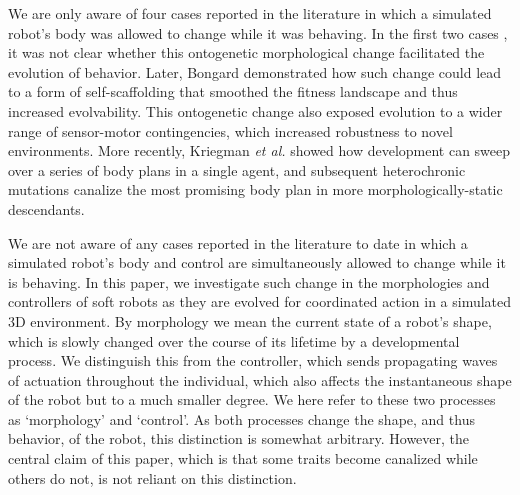 We are only aware of four cases reported in the literature in which a simulated robot's body was allowed to change while it was behaving.
In the first two cases \cite{ventrella1998designing, komosinski2003framsticks}, it was not clear whether this ontogenetic morphological change facilitated the evolution of behavior.
Later, Bongard \cite{bongard2011morphological} demonstrated how such change could lead to a form of self-scaffolding that smoothed the fitness landscape and thus increased evolvability.
This ontogenetic change also exposed evolution to a wider range of sensor-motor contingencies, which increased robustness to novel environments.
More recently, Kriegman \textit{et al.} \cite{kriegman2017minimal} showed how development can sweep over a series of body plans in a single agent, and subsequent heterochronic mutations canalize the most promising body plan in more morphologically-static descendants.


We are not aware of any cases reported in the literature to date in which a simulated robot's body and control are simultaneously allowed to change while it is behaving.
In this paper, we investigate such change in the morphologies and controllers of soft robots as they are evolved for coordinated action in a simulated 3D environment.
By morphology we mean the current state of a robot's shape, which is slowly changed over the course of its lifetime by a developmental process.
We distinguish this from the controller, which sends propagating waves of actuation throughout the individual, which also affects the instantaneous shape of the robot but to a much smaller degree.
We here refer to these two processes as `morphology' and `control'.
As both processes change the shape, and thus behavior, of the robot, this distinction is somewhat arbitrary.
However, the central claim of this paper, which is that some traits become canalized while others do not, is not reliant on this distinction.


